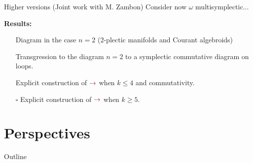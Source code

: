\documentclass[handout,10pt]{beamer}
\newcommand{\checkpoint}[0]{
	\ifHandout

	\else
	\addtocounter{framenumber}{-1}
 	\begin{frame}{Outline}
  		\tableofcontents[currentsection]
	\end{frame}
	\fi
}
\begin{document}
\begin{frame}{Higher versions (Joint work with M. Zambon)}
	Consider now $\omega$ multisymplectic...
	\vfill
	
	\vfill
	\textbf{Results:}
	\begin{itemize}
		\item[\CheckedBox] Diagram in the case $n=2$ (2-plectic manifolds and Courant algebroids)
		\item[\CheckedBox] Transgression to the diagram $n=2$ to a symplectic commutative diagram on loops.
		\item[\CheckedBox] Explicit construction of $\mathbf{\color{red!60!black}\rightarrow}$ when $k\leq 4$ and commutativity.
		\item[$\square$] Explicit construction of $\mathbf{\color{red!60!black}\rightarrow}$ when $k\geq 5$.
	\end{itemize}
\end{frame}
\note[itemize]{
	\item
}


\section{Perspectives}
\checkpoint

\end{document}
